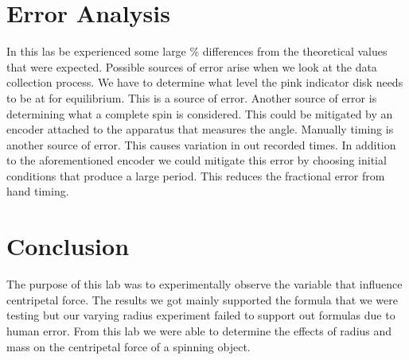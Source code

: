 \documentclass[12pt]{report}
\begin{document}
\begin{flushleft}
\begin{multicols}{2}
\section{Error Analysis}
In this las be experienced some large \% differences from the theoretical values that were expected. Possible sources of error arise when we look at the data collection process. We have to determine what level the pink indicator disk needs to be at for equilibrium. This is a source of error. Another source of error is determining what a complete spin is considered. This could be mitigated by an encoder attached to the apparatus that measures the angle. Manually timing is another source of error. This causes variation in out recorded times. In addition to the aforementioned encoder we could mitigate this error by choosing initial conditions that produce a large period. This reduces the fractional error from hand timing.

\section{Conclusion}
The purpose of this lab was to experimentally observe the variable that influence centripetal force. The results we got mainly supported the formula that we were testing but our varying radius experiment failed to support out formulas due to human error. From this lab we were able to determine the effects of radius and mass on the centripetal force of a spinning object.
\end{multicols}

\end{flushleft}
\end{document}
